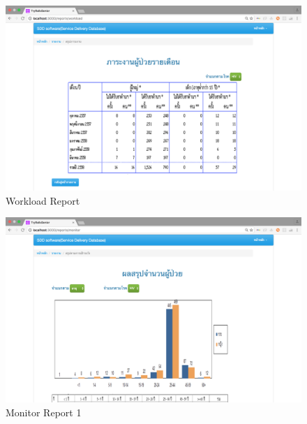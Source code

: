             \FloatBarrier
                \begin{figure}[h!]
                    \centering
                        \includegraphics[width=12cm]{images/chapter-01/mockup_rails/report.png}
                    	\caption{Workload Report}
                    	\label{report}
                \end{figure}
            \FloatBarrier
            
            \FloatBarrier
                \begin{figure}[h!]
                    \centering
                        \includegraphics[width=12cm]{images/chapter-01/mockup_rails/report1.png}
                    	\caption{Monitor Report 1}
                    	\label{report1}
                \end{figure}
            \FloatBarrier
            
